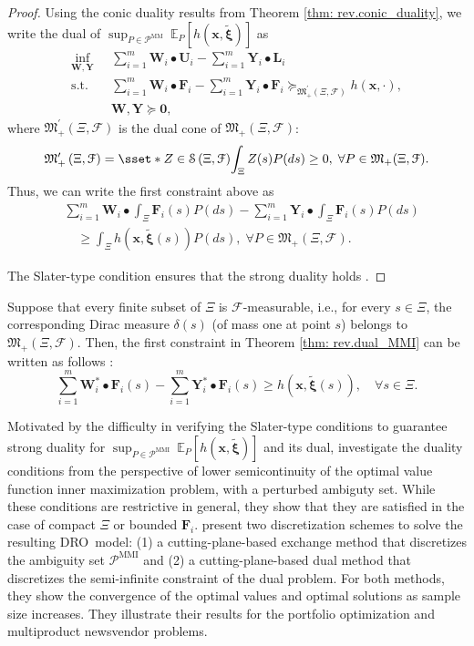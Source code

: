 \documentclass[final,onefignum,onetabnum]{class}
\newcommand{\ee}[2]{\mathbb{E}_{#1} \left[ #2 \right]}
\newcommand{\bs}[1]{\boldsymbol{#1}} %
\newcommand{\Cs}[1]{\mathcal{#1}} %
\newcommand{\Fs}[1]{\mathfrak{#1}} %
\newcommand{\txi}{\tilde{\bs{\xi}}}
\newcommand{\measurespace}{\left( \Xi, \Cs{F} \right)}
\newcommand{\M}{\Fs{M}_{+}(\Xi,\Cs{F})}
\newcommand{\dro}{DRO}
\newcommand{\st}{\text{s.t.}}
\begin{document}
\begin{proof}
Using the conic duality results from Theorem \ref{thm: rev.conic_duality}, we write the dual of \linebreak $\sup_{P \in \Cs{P}^{\text{MM}}} \ \ee{P}{h(\bs{x},\txi)}$ as 
    \begin{align*}
        \inf_{\bs{W},\bs{Y}} \ & \sum_{i=1}^{m}  \bs{W}_{i} \bullet  \bs{U}_{i}  -\sum_{i=1}^{m} \bs{Y}_{i} \bullet \bs{L}_{i}  \\
        \st \quad & \sum_{i=1}^{m}  \bs{W}_{i} \bullet  \bs{F}_{i}  - \sum_{i=1}^{m}  \bs{Y}_{i} \bullet \bs{F}_{i} \succcurlyeq_{\Fs{M}_{+}^{\prime}\measurespace}  h(\bs{x},\cdot), \\
        & \bs{W},\bs{Y} \succcurlyeq \bs{0},
    \end{align*}
where $\Fs{M}_{+}^{\prime}\measurespace$ is the dual cone of $\Fs{M}_{+}\measurespace$: $$\Fs{M}_{+}^{\prime}\measurespace=\sset*{Z \in \Cs{S}\measurespace}{ \int_{\Xi} Z(s) P(ds) \ge 0, \; \forall P \in \M}.$$ Thus,
we can write the first constraint above as 
\begin{equation*}
    \begin{split}
        & \sum_{i=1}^{m}  \bs{W}_{i} \bullet \int_{\Xi} \bs{F}_{i}(s) P(ds)  - \sum_{i=1}^{m}  \bs{Y}_{i} \bullet \int_{\Xi} \bs{F}_{i}(s) P(ds)  \\
        &  \quad {} \ge \int_{\Xi} h(\bs{x},\txi(s)) P(ds), \; \forall P \in \M.
    \end{split}    
\end{equation*}
 
The Slater-type condition ensures that the strong duality holds  \cite{shapiro2001duality}. 
\end{proof}
Suppose that   every finite subset of $\Xi$ is $\Cs{F}$-measurable, i.e., for every $s \in \Xi$, the corresponding Dirac measure $\delta(s)$ (of mass one at point $s$) belongs to $\M$. Then, the first constraint in Theorem \ref{thm: rev.dual_MMI} can be written as follows \cite{shapiro2001duality}: $$\sum_{i=1}^{m}    \bs{W}_{i}^{*}  \bullet \bs{F}_{i}(s) - \sum_{i=1}^{m}  \bs{Y}_{i}^{*}  \bullet \bs{F}_{i}(s)  \ge  h(\bs{x}, \txi(s)), \quad \forall s \in \Xi.$$

Motivated by the difficulty in verifying the Slater-type conditions to  guarantee  strong duality for $\sup_{P \in \Cs{P}^{\text{MMI}}} \ \ee{P}{h(\bs{x},\txi)}$ and its dual, \citet{xu2018matrix} investigate the duality conditions
from the perspective of  lower semicontinuity of the optimal value function inner maximization problem, with  a perturbed ambiguty set. While these conditions are restrictive in general, they show that they are satisfied in the case of compact $\Xi$ or bounded $\bs{F}_{i}$. %
\citet{xu2018matrix} present two discretization schemes to solve the resulting \dro\ model: (1) a cutting-plane-based exchange method that discretizes the ambiguity set  $\Cs{P}^{\text{MMI}}$ and (2) a cutting-plane-based dual method that discretizes the semi-infinite constraint of the dual problem. For both methods, they show the convergence of the optimal values and optimal solutions as sample size increases. They illustrate their results for  the portfolio optimization and multiproduct newsvendor problems. 
\end{document}
